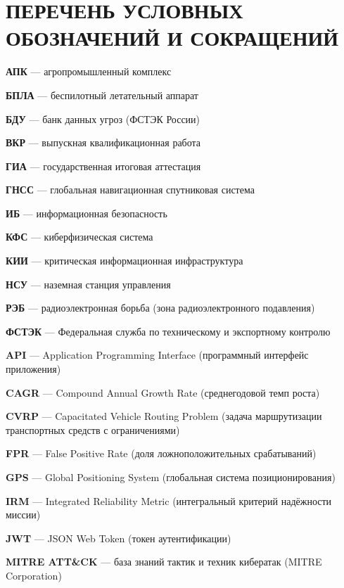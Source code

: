 \documentclass[14pt,a4paper]{extarticle}
\begin{document}
\tableofcontents
\clearpage

\hypertarget{abbreviations}{%
\section{ПЕРЕЧЕНЬ УСЛОВНЫХ ОБОЗНАЧЕНИЙ И СОКРАЩЕНИЙ}\label{abbreviations}}

\noindent\textbf{АПК} --- агропромышленный комплекс

\noindent\textbf{БПЛА} --- беспилотный летательный аппарат

\noindent\textbf{БДУ} --- банк данных угроз (ФСТЭК России)

\noindent\textbf{ВКР} --- выпускная квалификационная работа

\noindent\textbf{ГИА} --- государственная итоговая аттестация

\noindent\textbf{ГНСС} --- глобальная навигационная спутниковая система

\noindent\textbf{ИБ} --- информационная безопасность

\noindent\textbf{КФС} --- киберфизическая система

\noindent\textbf{КИИ} --- критическая информационная инфраструктура

\noindent\textbf{НСУ} --- наземная станция управления

\noindent\textbf{РЭБ} --- радиоэлектронная борьба (зона радиоэлектронного подавления)

\noindent\textbf{ФСТЭК} --- Федеральная служба по техническому и экспортному контролю

\noindent\textbf{API} --- Application Programming Interface (программный интерфейс приложения)

\noindent\textbf{CAGR} --- Compound Annual Growth Rate (среднегодовой темп роста)

\noindent\textbf{CVRP} --- Capacitated Vehicle Routing Problem (задача маршрутизации транспортных средств с ограничениями)

\noindent\textbf{FPR} --- False Positive Rate (доля ложноположительных срабатываний)

\noindent\textbf{GPS} --- Global Positioning System (глобальная система позиционирования)

\noindent\textbf{IRM} --- Integrated Reliability Metric (интегральный критерий надёжности миссии)

\noindent\textbf{JWT} --- JSON Web Token (токен аутентификации)

\noindent\textbf{MITRE ATT\&CK} --- база знаний тактик и техник кибератак (MITRE Corporation)
\end{document}
